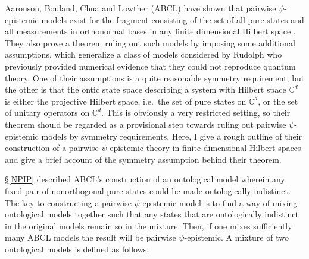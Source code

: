 \documentclass[DIV=calc,paper=a4,fontsize=11pt,twocolumn]{scrartcl} %
\theoremstyle{definition}
\theoremstyle{plain}
\begin{document}
Aaronson, Bouland, Chua and Lowther (ABCL) have shown that pairwise
$\psi$-epistemic models exist for the fragment consisting of the set
of all pure states and all measurements in orthonormal bases in any
finite dimensional Hilbert space \cite{Aaronson2013}.  They also prove
a theorem ruling out such models by imposing some additional
assumptions, which generalize a class of models considered by Rudolph
\cite{Rudolph2006} who previously provided numerical evidence that
they could not reproduce quantum theory.  One of their assumptions is
a quite reasonable symmetry requirement, but the other is that the
ontic state space describing a system with Hilbert space
$\mathbb{C}^d$ is either the projective Hilbert space, i.e.\ the set
of pure states on $\mathbb{C}^d$, or the set of unitary operators on
$\mathbb{C}^d$.  This is obviously a very restricted setting, so their
theorem should be regarded as a provisional step towards ruling out
pairwise $\psi$-epistemic models by symmetry requirements.  Here, I
give a rough outline of their construction of a pairwise
$\psi$-epistemic theory in finite dimensional Hilbert spaces and give
a brief account of the symmetry assumption behind their theorem.

\S\ref{NPIP} described ABCL's construction of an ontological model
wherein any fixed pair of nonorthogonal pure states could be made
ontologically indistinct.  The key to constructing a pairwise
$\psi$-epistemic model is to find a way of mixing ontological models
together such that any states that are ontologically indistinct in the
original models remain so in the mixture.  Then, if one mixes
sufficiently many ABCL models the result will be pairwise
$\psi$-epistemic.  A mixture of two ontological models is defined as
follows.
\end{document}
